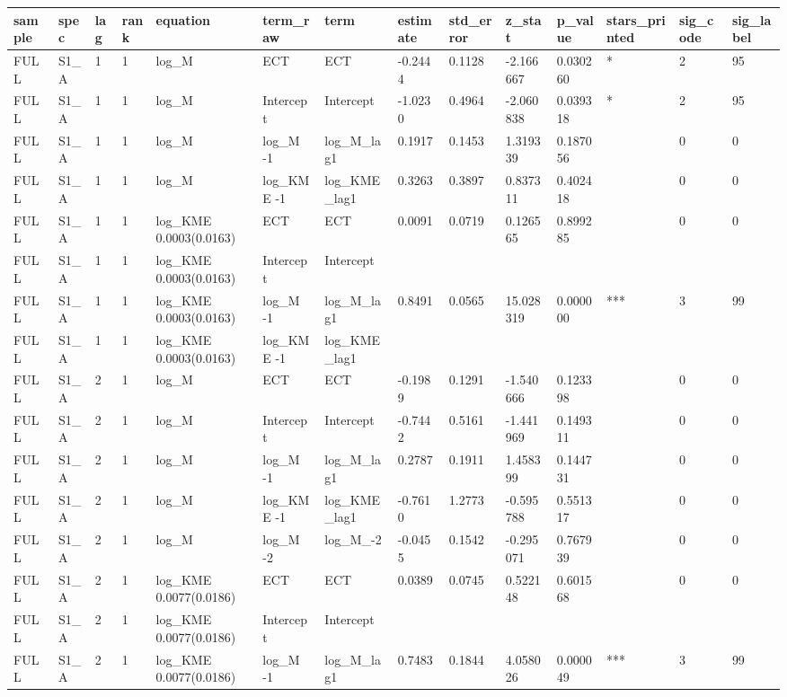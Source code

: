 \begin{tabular}{llllllllllllll}
\hline
sample & spec & lag & rank & equation & term\_raw & term & estimate & std\_error & z\_stat & p\_value & stars\_printed & sig\_code & sig\_label \\
\hline
FULL & S1\_A & 1 & 1 & log\_M & ECT & ECT & -0.2444 & 0.1128 & -2.166667 & 0.030260 & * & 2 & 95 \\
FULL & S1\_A & 1 & 1 & log\_M & Intercept & Intercept & -1.0230 & 0.4964 & -2.060838 & 0.039318 & * & 2 & 95 \\
FULL & S1\_A & 1 & 1 & log\_M & log\_M -1 & log\_M\_lag1 & 0.1917 & 0.1453 & 1.319339 & 0.187056 &  & 0 & 0 \\
FULL & S1\_A & 1 & 1 & log\_M & log\_KME -1 & log\_KME\_lag1 & 0.3263 & 0.3897 & 0.837311 & 0.402418 &  & 0 & 0 \\
FULL & S1\_A & 1 & 1 & log\_KME 0.0003(0.0163) & ECT & ECT & 0.0091 & 0.0719 & 0.126565 & 0.899285 &  & 0 & 0 \\
FULL & S1\_A & 1 & 1 & log\_KME 0.0003(0.0163) & Intercept & Intercept &  &  &  &  &  &  &  \\
FULL & S1\_A & 1 & 1 & log\_KME 0.0003(0.0163) & log\_M -1 & log\_M\_lag1 & 0.8491 & 0.0565 & 15.028319 & 0.000000 & *** & 3 & 99 \\
FULL & S1\_A & 1 & 1 & log\_KME 0.0003(0.0163) & log\_KME -1 & log\_KME\_lag1 &  &  &  &  &  &  &  \\
FULL & S1\_A & 2 & 1 & log\_M & ECT & ECT & -0.1989 & 0.1291 & -1.540666 & 0.123398 &  & 0 & 0 \\
FULL & S1\_A & 2 & 1 & log\_M & Intercept & Intercept & -0.7442 & 0.5161 & -1.441969 & 0.149311 &  & 0 & 0 \\
FULL & S1\_A & 2 & 1 & log\_M & log\_M -1 & log\_M\_lag1 & 0.2787 & 0.1911 & 1.458399 & 0.144731 &  & 0 & 0 \\
FULL & S1\_A & 2 & 1 & log\_M & log\_KME -1 & log\_KME\_lag1 & -0.7610 & 1.2773 & -0.595788 & 0.551317 &  & 0 & 0 \\
FULL & S1\_A & 2 & 1 & log\_M & log\_M -2 & log\_M\_-2 & -0.0455 & 0.1542 & -0.295071 & 0.767939 &  & 0 & 0 \\
FULL & S1\_A & 2 & 1 & log\_KME 0.0077(0.0186) & ECT & ECT & 0.0389 & 0.0745 & 0.522148 & 0.601568 &  & 0 & 0 \\
FULL & S1\_A & 2 & 1 & log\_KME 0.0077(0.0186) & Intercept & Intercept &  &  &  &  &  &  &  \\
FULL & S1\_A & 2 & 1 & log\_KME 0.0077(0.0186) & log\_M -1 & log\_M\_lag1 & 0.7483 & 0.1844 & 4.058026 & 0.000049 & *** & 3 & 99 \\

\end{tabular}
